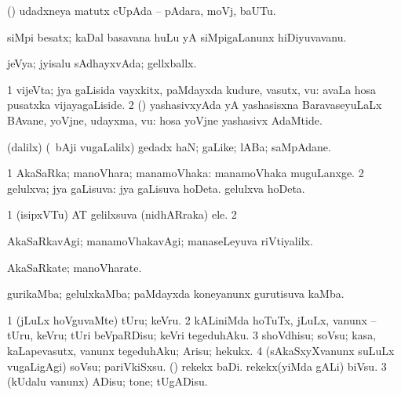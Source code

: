 {{{{{{\bentry
{}
  \gl{\nA}\bmng
(\ashi) udadxneya matutx cUpAda -- pAdara, moVj, baUTu. 
\emng
\eentry

\bentry
{}
  \gl{\nA}\bmng
siMpi besatx; kaDal basavana huLu yA siMpigaLanunx hiDiyuvavanu. 
\emng
\eentry

\bentry
{}
  \gl{\gu}\bmng
jeVya; jyisalu sAdhayxvAda; gellxballx. 
\emng
\eentry

\bentry
{}
  \gl{\nA}\bmng
\bnum
\num{1} vijeVta; jya gaLisida vayxkitx, paMdayxda kudure, vasutx, \mo vu:  avaLa hosa pusatxka vijayagaLiside. 
\num{2} (\AmA) yashasivxyAda yA yashasisxna BaravaseyuLaLx BAvane, yoVjne, udayxma, \mo vu:  hosa yoVjne yashasivx AdaMtide. 
\enum
\emng
\eentry

\bentry
{} 
\gl{\nA}
\expl{}
\bmng
(\bava dalilx) (\kanmu\ bAji \mo vugaLalilx) gedadx haN; gaLike; lABa; saMpAdane. 
\emng
\eentry

\bentry
{} 
\gl{\gu}
\expl{}
\bmng
\bnum
\num{1} AkaSaRka; manoVhara; manamoVhaka:  manamoVhaka muguLanxge. 
\num{2} gelulxva; jya gaLisuva:  jya gaLisuva hoDeta.  gelulxva hoDeta. 
\enum
\emng

\noindent 
\gl{\pagu}
\expl{}
\bmng
\bnum
\num{1} (isipxVTu) AT gelilxsuva (nidhARraka) ele. 
\num{2} 
\enum
\emng
\eentry

\bentry
{}
\gl{\kirxvi}
\bmng
AkaSaRkavAgi; manamoVhakavAgi; manaseLeyuva riVtiyalilx. 
\emng
\eentry

\bentry
{}
  \gl{\nA}\bmng
AkaSaRkate; manoVharate. 
\emng
\eentry

\bentry
{}
  \gl{\nA}\bmng
gurikaMba; gelulxkaMba; paMdayxda koneyanunx gurutisuva kaMba. 
\emng
\eentry

\bentry
{}
  \gl{\sakirx}\bmng
\bnum
\num{1} (jLuLx hoVguvaMte) tUru; keVru. 
\num{2} kALiniMda hoTuTx, jLuLx, \mo vanunx -- tUru, keVru; tUri beVpaRDisu; keVri tegeduhAku. 
\num{3} shoVdhisu; soVsu; kasa, kaLapevasutx, \mo vanunx tegeduhAku; Arisu; hekukx. 
\num{4} (sAkaSxyXvanunx suLuLx \mo vugaLigAgi) soVsu; pariVkiSxsu. 
 (\kAparx) 
\banum
{} rekekx baDi. 
 rekekx(yiMda gALi) biVsu. 
\eanum
\numie
\num{3} (kUdalu \mo vanunx) ADisu; tone; tUgADisu. 
\enum
\emng
\eentry

}}}}}}
